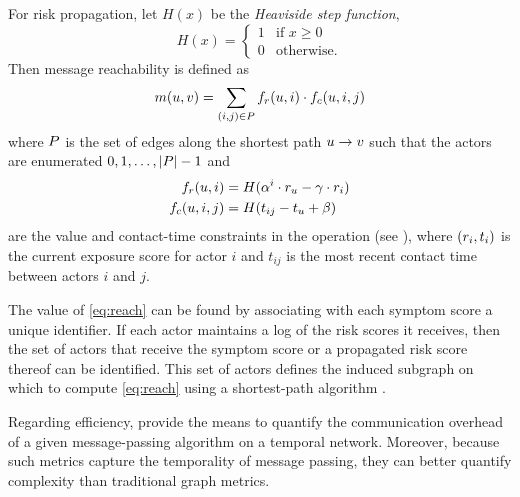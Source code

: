 For risk propagation, let $H(x)$ be the \emph{Heaviside step function},
%
\begin{equation*}
    H(x) = 
    \begin{cases}
        1 & \text{if } x \geq 0 \\
        0 & \text{otherwise.}
    \end{cases}
\end{equation*}
%
Then message reachability is defined as
%
\begin{equation}\label{eq:reach}
    m(u, v) = \sum_{(i, j) \in P} f_{r}(u, i) \cdot f_{c}(u, i, j)
\end{equation}
%
where $P$ is the set of edges along the shortest path $u \rightarrow v$ such that the actors are enumerated $0, 1, \ldots, \left\vert P \right\vert - 1$ and
%
\begin{align}
    f_{r}(u, i) &= H(\alpha^i \cdot r_u - \gamma \cdot r_i)\label{eq:value-const} \\
    f_{c}(u, i, j) &= H(t_{ij} - t_u + \beta) \label{eq:contact-const}
\end{align}
%
are the value and contact-time constraints in the \cShouldReceive[] operation (see ), where $(r_i, t_i)$ is the current exposure score for actor $i$ and $t_{ij}$ is the most recent contact time between actors $i$ and $j$.

The value of \eqref{eq:reach} can be found by associating with each symptom score a unique identifier. If each actor maintains a log of the risk scores it receives, then the set of actors that receive the symptom score or a propagated risk score thereof can be identified. This set of actors defines the induced subgraph on which to compute \eqref{eq:reach} using a shortest-path algorithm \cite{Johnson1977}. 

Regarding efficiency,  provide the means to quantify the communication overhead of a given message-passing algorithm on a temporal network. Moreover, because such metrics capture the temporality of message passing, they can better quantify complexity than traditional graph metrics.

